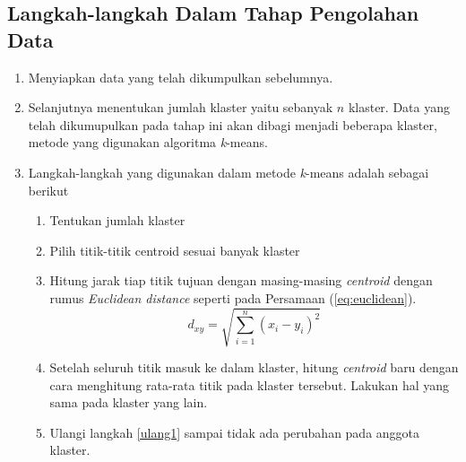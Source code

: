 \subsection{Langkah-langkah Dalam Tahap Pengolahan Data}
\begin{enumerate}
    \item Menyiapkan data yang telah dikumpulkan sebelumnya.
    \item Selanjutnya menentukan jumlah klaster yaitu sebanyak $n$ klaster. Data yang telah dikumupulkan pada tahap ini akan dibagi menjadi beberapa klaster, metode yang digunakan algoritma \textit{k}-means.
    \item Langkah-langkah yang digunakan dalam metode \textit{k}-means adalah sebagai berikut
    \begin{enumerate}
        \item Tentukan jumlah klaster
        \item Pilih titik-titik centroid sesuai banyak klaster
        \item \label{ulang1} Hitung jarak tiap titik tujuan dengan masing-masing \textit{centroid} dengan rumus \textit{Euclidean distance} seperti pada Persamaan (\ref{eq:euclidean}).
        \begin{equation}
        d_{xy}=\sqrt{\sum_{i=1}^{n}(x_i-y_i)^{2}}
        \label{eq:euclidean}
        \end{equation}
        \item Setelah seluruh titik masuk ke dalam klaster, hitung \textit{centroid} baru dengan cara menghitung rata-rata titik pada klaster tersebut. Lakukan hal yang sama pada klaster yang lain.
        \item Ulangi langkah \ref{ulang1} sampai tidak ada perubahan pada anggota klaster.
    \end{enumerate}
	

\end{enumerate}
